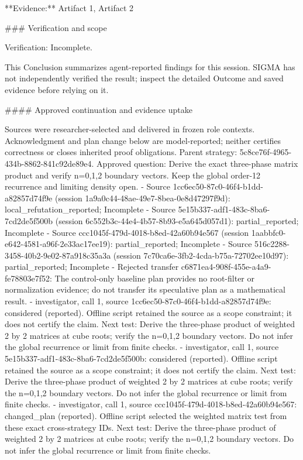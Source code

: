 \documentclass[11pt]{article}
\begin{document}
**Evidence:** Artifact 1, Artifact 2

\#\#\# Verification and scope

Verification: Incomplete.

This Conclusion summarizes agent-reported findings for this session. SIGMA has not independently verified the result; inspect the detailed Outcome and saved evidence before relying on it.

\#\#\#\# Approved continuation and evidence uptake

Sources were researcher-selected and delivered in frozen role contexts. Acknowledgment and plan change below are model-reported; neither certifies correctness or closes inherited proof obligations.
Parent strategy: 5c8ce76f-4965-434b-8862-841c92de89e4. Approved question: Derive the exact three-phase matrix product and verify n=0,1,2 boundary vectors. Keep the global order-12 recurrence and limiting density open.
- Source 1cc6ec50-87c0-46f4-b1dd-a82857d74f9e (session 1a9a0c44-48ae-49e7-8bea-0e8d47297f9d): local\_refutation\_reported; Incomplete
- Source 5e15b337-adf1-483c-8ba6-7cd2de5f500b (session 6c552b3c-44e4-4b57-8b93-e5a645d057d1): partial\_reported; Incomplete
- Source ccc1045f-479d-4018-b8ed-42a60b94e567 (session 1aabbfc0-e642-4581-a96f-2e33ac17ee19): partial\_reported; Incomplete
- Source 516c2288-3458-40b2-9e02-87a918c35a3a (session 7c70ca6e-3fb2-4cda-b75a-72702ee10d97): partial\_reported; Incomplete
- Rejected transfer c6871ea4-908f-455e-a4a9-fe78803e7f52: The control-only baseline plan provides no root-filter or normalization evidence; do not transfer its speculative plan as a mathematical result.
- investigator, call 1, source 1cc6ec50-87c0-46f4-b1dd-a82857d74f9e: considered (reported). Offline script retained the source as a scope constraint; it does not certify the claim. Next test: Derive the three-phase product of weighted 2 by 2 matrices at cube roots; verify the n=0,1,2 boundary vectors. Do not infer the global recurrence or limit from finite checks.
- investigator, call 1, source 5e15b337-adf1-483c-8ba6-7cd2de5f500b: considered (reported). Offline script retained the source as a scope constraint; it does not certify the claim. Next test: Derive the three-phase product of weighted 2 by 2 matrices at cube roots; verify the n=0,1,2 boundary vectors. Do not infer the global recurrence or limit from finite checks.
- investigator, call 1, source ccc1045f-479d-4018-b8ed-42a60b94e567: changed\_plan (reported). Offline script selected the weighted matrix test from these exact cross-strategy IDs. Next test: Derive the three-phase product of weighted 2 by 2 matrices at cube roots; verify the n=0,1,2 boundary vectors. Do not infer the global recurrence or limit from finite checks.
\end{document}
